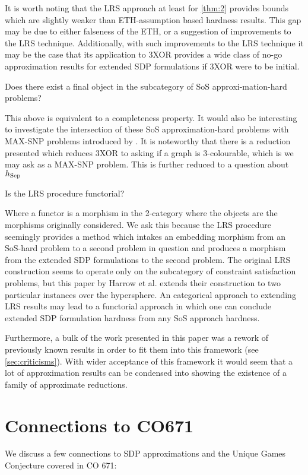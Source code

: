 \documentclass[runningheads,a4paper,english]{llncs}[2022/01/12]
\begin{document}
It is worth noting that the LRS approach at least for \cref{thm:2} provides bounds which are slightly weaker than ETH-assumption based hardness results.
This gap may be due to either falseness of the ETH, or a suggestion of improvements to the LRS technique.
Additionally, with such improvements to the LRS technique it may be the case that its application to \textsc{3XOR} provides a wide class of no-go approximation results for extended SDP formulations if \textsc{3XOR} were to be initial.

\begin{conjecture}
Does there exist a final object in the subcategory of SoS approxi-mation-hard problems?
\end{conjecture}
This above is equivalent to a completeness property.
It would also be interesting to investigate the intersection of these SoS approximation-hard problems with MAX-SNP problems introduced by \cite{PAPADIMITRIOU1991425}.
It is noteworthy that there is a reduction presented which reduces \textsc{3XOR} to asking if a graph is 3-colourable, which is we may ask as a MAX-SNP problem.
This is further reduced to a question about $h_{\operatorname{Sep}}$

\begin{conjecture}
Is the LRS procedure functorial?
\end{conjecture}
Where a functor is a morphism in the 2-category where the objects are the morphisms originally considered.
We ask this because the LRS procedure seemingly provides a method which intakes an embedding morphism from an SoS-hard problem to a second problem in question and produces a morphism from the extended SDP formulations to the second problem.
The original LRS construction seems to operate only on the subcategory of constraint satisfaction problems, but this paper by Harrow et al. extends their construction to two particular instances over the hypersphere.
An categorical approach to extending LRS results may lead to a functorial approach in which one can conclude extended SDP formulation hardness from any SoS approach hardness.

Furthermore, a bulk of the work presented in this paper was a rework of previously known results in order to fit them into this framework (see \cref{sec:criticisms}). 
With wider acceptance of this framework it would seem that a lot of approximation results can be condensed into showing the existence of a family of approximate reductions.

\section{Connections to CO671}
We discuss a few connections to SDP approximations and the Unique Games Conjecture covered in CO 671:
\end{document}
